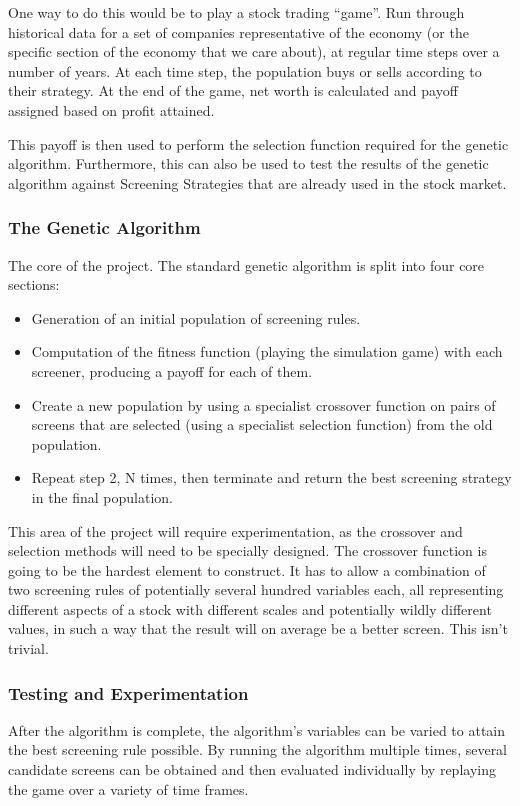 One way to do this would be to play a stock trading “game”. Run through historical data for a set of companies representative of the economy (or the specific section of the economy that we care about), at regular time steps over a number of years. At each time step, the population buys or sells according to their strategy. At the end of the game, net worth is calculated and payoff assigned based on profit attained. \newline

This payoff is then used to perform the selection function required for the genetic algorithm. Furthermore, this can also be used to test the results of the genetic algorithm against Screening Strategies that are already used in the stock market.

\subsubsection{The Genetic Algorithm}
The core of the project. The standard genetic algorithm is split into four core sections:
\begin{itemize}
\item Generation of an initial population of screening rules.
\item Computation of the fitness function (playing the simulation game) with each screener, producing a payoff for each of them.
\item Create a new population by using a specialist crossover function on pairs of screens that are selected (using a specialist selection function) from the old population.
\item Repeat step 2, N times, then terminate and return the best screening strategy in the final population.
\end{itemize}

This area of the project will require experimentation, as the crossover and selection methods will need to be specially designed. The crossover function is going to be the hardest element to construct. It has to allow a combination of two screening rules of potentially several hundred variables each, all representing different aspects of a stock with different scales and potentially wildly different values, in such a way that the result will on average be a better screen. This isn’t trivial.

\subsubsection{Testing and Experimentation}
After the algorithm is complete, the algorithm’s variables can be varied to attain the best screening rule possible. By running the algorithm multiple times, several candidate screens can be obtained and then evaluated individually by replaying the game over a variety of time frames. \newline

